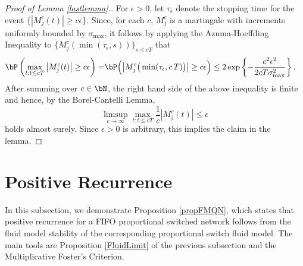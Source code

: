 \documentclass{amsart}
\begin{document}
\begin{proof}[Proof of Lemma \ref{lastlemma}.]
For $\epsilon > 0$, let
$\tau_\epsilon$ denote the stopping time for the event $\{ |M_j^c(t)| \ge c\epsilon  \}$.  
Since, for each $c$, $M_j^c$ is a martingale with increments uniformly bounded by 
$\sigma_{\text{max}}$, it follows by applying 
the Azuma-Hoeffding Inequality \cite[E14.2]{Wi91} to $\{ M_j^{c}(\min(\tau_\epsilon, s)) \}_{s\leq cT}$ that
\begin{align*}
  \bP \left(  \max_{t: t \leq c T} \left| M_j^{c}(t)\right| \ge c\epsilon  \right) 
= & \bP\Big( \big|M_j^c\big(\min(\tau_\epsilon, c \, T)\big)\big| \ge c\epsilon \Big) \leq  2 \exp\left\{ - \frac{c^2\epsilon^2}{2 cT \sigma_{\max}^2 } \right\}.
\end{align*}
After summing over $c\in\bN$, the right hand side of the above inequality is finite and hence,
by the Borel-Cantelli Lemma, 
\[
\limsup_{c\rightarrow \infty}  \max_{t: t\leq c T} \frac{1}{c} \left| M_j^{c}(t) \right|  \leq \epsilon
\]
holds almost surely.  Since $\epsilon >0$ is arbitrary, this implies the claim in the lemma.
\end{proof}

\iffalse
\NW{We briefly comment that if we allowed for schedules to be random, as discussed in Remark \ref{ScheduleRemark}, then the convergence of   \eqref{FinalBound} would still hold under the Martingale Convergence Theorem. And thus fluid model under random schedules (with expected values $\mS$) is given by the same fluid model equations. Since our fluid analysis does not require the set of schedules to be integral, positive recurrence holds in this case also.}
\fi

\section{Positive Recurrence}
\label{Appendix F}

In this subsection, we demonstrate Proposition \ref{propFMQN}, which states that 
positive recurrence for a FIFO proportional switched network follows
from the fluid model stability of the corresponding  proportional switch fluid model.  The
main tools are Proposition \ref{FluidLimit} of the previous subsection and the Multiplicative Foster\rq{}s Criterion.
\end{document}
